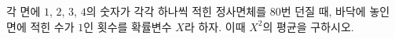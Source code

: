 각 면에 $1$, $2$, $3$, $4$의 숫자가 각각 하나씩 적힌 정사면체를 80번 던질 때, 바닥에 놓인 면에 적힌 수가 $1$인 횟수를 확률변수 $X$라 하자. 이때 $X^2$의 평균을 구하시오.
